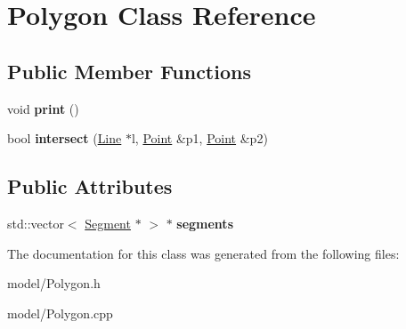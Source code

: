 \hypertarget{classPolygon}{\section{Polygon Class Reference}
\label{classPolygon}
}
\subsection*{Public Member Functions}
\begin{DoxyCompactItemize}
\item 
\hypertarget{classPolygon_a60830487fc3c6b815aa577e9dd758b51}{void {\bfseries print} ()}\label{classPolygon_a60830487fc3c6b815aa577e9dd758b51}

\item 
\hypertarget{classPolygon_a83cdc668a8bbc70f622cb4d18117227f}{bool {\bfseries intersect} (\hyperlink{classLine}{Line} $\ast$l, \hyperlink{structPoint}{Point} \&p1, \hyperlink{structPoint}{Point} \&p2)}\label{classPolygon_a83cdc668a8bbc70f622cb4d18117227f}

\end{DoxyCompactItemize}
\subsection*{Public Attributes}
\begin{DoxyCompactItemize}
\item 
\hypertarget{classPolygon_ae29d117eb51f45ed8f7e04f1c54bb02f}{std\-::vector$<$ \hyperlink{classSegment}{Segment} $\ast$ $>$ $\ast$ {\bfseries segments}}\label{classPolygon_ae29d117eb51f45ed8f7e04f1c54bb02f}

\end{DoxyCompactItemize}


The documentation for this class was generated from the following files\-:\begin{DoxyCompactItemize}
\item 
model/Polygon.\-h\item 
model/Polygon.\-cpp\end{DoxyCompactItemize}

